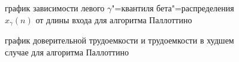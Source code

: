 \documentclass[a4paper,fontsize=14pt]{article}
\begin{document}
\begin{figure}[!]
	\caption{график зависимости левого $\gamma$"=квантиля бета"=распределения $x_\gamma(n)$ от длины входа для алгоритма Паллоттино}
	\label{image5}
\end{figure}

\begin{figure}[!]
	\caption{график доверительной трудоемкости и трудоемкости в худшем случае для алгоритма Паллоттино}
	\label{image6}
\end{figure}

\newpage
\end{document}
